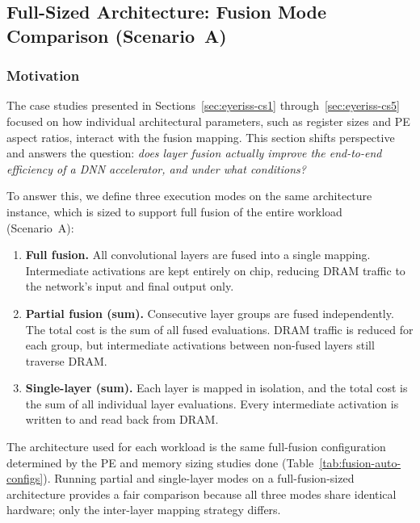 \subsection{Full-Sized Architecture: Fusion Mode Comparison (Scenario~A)}
\label{sec:fusion-full-sized}

\subsubsection{Motivation}

The case studies presented in Sections~\ref{sec:eyeriss-cs1}
through~\ref{sec:eyeriss-cs5} focused on how individual
architectural parameters, such as register sizes and PE aspect
ratios, interact with the fusion mapping.
This section shifts perspective and answers the question:
\emph{does layer fusion actually improve the end-to-end efficiency
of a DNN accelerator, and under what conditions?}

To answer this, we define three execution modes on the same
architecture instance, which is sized to support full fusion of the
entire workload (Scenario~A):
\begin{enumerate}
  \item \textbf{Full fusion.}
        All convolutional layers are fused into a single mapping.
        Intermediate activations are kept entirely on chip, reducing
        DRAM traffic to the network's input and final output only.
  \item \textbf{Partial fusion (sum).}
        Consecutive layer groups are fused independently.
        The total cost is the sum of all fused evaluations.
        DRAM traffic is reduced for each group, but intermediate
        activations between non-fused layers still traverse DRAM.
  \item \textbf{Single-layer (sum).}
        Each layer is mapped in isolation, and the total cost is
        the sum of all individual layer evaluations.
        Every intermediate activation is written to and read back
        from DRAM.
\end{enumerate}

The architecture used for each workload is the same full-fusion
configuration determined by the PE and memory sizing studies done
(Table~\ref{tab:fusion-auto-configs}).
Running partial and single-layer modes on a full-fusion-sized
architecture provides a fair comparison because all three modes
share identical hardware; only the inter-layer mapping
strategy differs.


